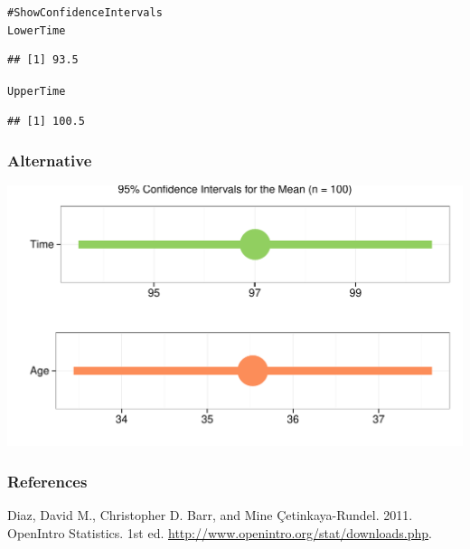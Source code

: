 \documentclass{beamer}\usepackage{graphicx, color}
\makeatletter
\def\maxwidth{ %
  \ifdim\Gin@nat@width>\linewidth
    \linewidth
  \else
    \Gin@nat@width
  \fi
}
\newcommand{\hlcomment}[1]{\textcolor[rgb]{0.180392156862745,0.6,0.341176470588235}{#1}}%
\newenvironment{kframe}{%
 \def\at@end@of@kframe{}%
 \ifinner\ifhmode%
  \def\at@end@of@kframe{\end{minipage}}%
  \begin{minipage}{\columnwidth}%
 \fi\fi%
 \def\FrameCommand##1{\hskip\@totalleftmargin \hskip-\fboxsep
 \colorbox{shadecolor}{##1}\hskip-\fboxsep
     \hskip-\linewidth \hskip-\@totalleftmargin \hskip\columnwidth}%
 \MakeFramed {\advance\hsize-\width
   \@totalleftmargin\z@ \linewidth\hsize
   \@setminipage}}%
 {\par\unskip\endMakeFramed%
 \at@end@of@kframe}
\newenvironment{knitrout}{}{} %
\makeatother
\begin{document}
\begin{frame}[fragile]
\begin{knitrout}
\color{fgcolor}\begin{kframe}
\begin{alltt}
\hlcomment{# Show Confidence Intervals}
LowerTime
\end{alltt}
\begin{verbatim}
## [1] 93.5
\end{verbatim}
\begin{alltt}

UpperTime
\end{alltt}
\begin{verbatim}
## [1] 100.5
\end{verbatim}
\end{kframe}
\end{knitrout}




\end{frame}


\begin{frame}[fragile]
  \frametitle{Alternative}



\begin{knitrout}
\color{fgcolor}

{\centering \includegraphics[width=\maxwidth]{figure/ConfIntPlot} 

}


\end{knitrout}

\end{frame}


\begin{frame}[allowframebreaks]
  \frametitle{References}
  Diaz, David M., Christopher D. Barr, and Mine \c{C}etinkaya-Rundel. 2011. OpenIntro Statistics. 1st ed. \url{http://www.openintro.org/stat/downloads.php}. \\[0.25cm] 
\end{frame}
\end{document}
